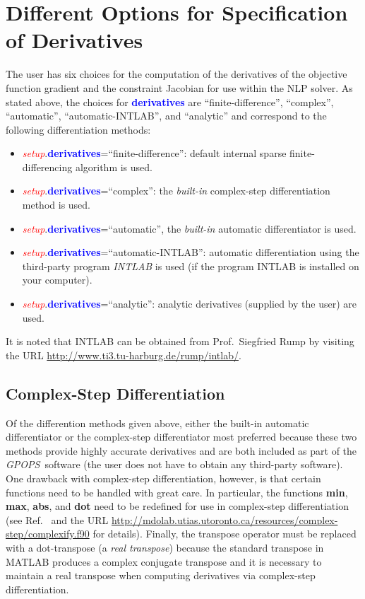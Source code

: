 \documentclass[10pt]{article}
\newcommand{\gpops}{{\em GPOPS}~}
\newcommand{\bfblue}[1]{\textcolor{blue}{\bf #1}}
\newcommand{\slred}[1]{\textcolor{red}{\sl #1}}
\begin{document}
\section{Different Options for Specification of Derivatives\label{sect:derivatives}}

The user has six choices for the computation of the derivatives of
the objective function gradient and the constraint Jacobian for use
within the NLP solver.  As stated above, the choices for
\bfblue{derivatives} are ``finite-difference'', ``complex'',
``automatic'', ``automatic-INTLAB'', and ``analytic'' and correspond
to the following differentiation methods: 
\begin{itemize}
\item \slred{setup}.\bfblue{derivatives}=``finite-difference'':
 default internal sparse finite-differencing algorithm is used.  
\item \slred{setup}.\bfblue{derivatives}=``complex'': the {\em
   built-in} complex-step differentiation method is used.
\item \slred{setup}.\bfblue{derivatives}=``automatic'', the {\em
    built-in} automatic differentiator is used.
\item \slred{setup}.\bfblue{derivatives}=``automatic-INTLAB'':
 automatic differentiation using the third-party program  {\em
   INTLAB} is used (if the program INTLAB is installed on your computer).
\item \slred{setup}.\bfblue{derivatives}=``analytic'': analytic derivatives
(supplied by the user) are used.
\end{itemize}
It is noted that INTLAB can be obtained from Prof.~Siegfried Rump by
visiting the URL \url{http://www.ti3.tu-harburg.de/rump/intlab/}.  

\subsection{Complex-Step Differentiation}

Of the differention methods given above, either the built-in automatic
differentiator or the complex-step differentiator most preferred
because these two methods provide highly accurate derivatives and are
both included as part of the \gpops software (\ie the user
does not have to obtain any third-party software). One drawback with
complex-step differentiation, however, is that certain functions need
to be handled with great care.  In particular, the functions {\bf
  min}, {\bf max}, {\bf abs}, and {\bf dot} need to be redefined for
use in complex-step differentiation (see Ref.~ and the URL
\url{http://mdolab.utias.utoronto.ca/resources/complex-step/complexify.f90}
for details).  Finally, the transpose operator must be replaced with a
dot-transpose (\ie a {\em real transpose}) because the standard
transpose in MATLAB produces a complex conjugate transpose and it is
necessary to maintain a real transpose when computing derivatives via
complex-step differentiation.
\end{document}
